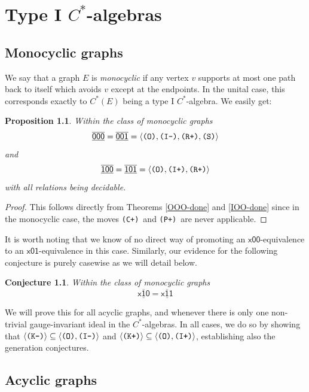\documentclass[12pt]{amsbook}%
\newtheorem{propo}[theor]{Proposition}
\theoremstyle{defin}
\newtheorem{conje}[theor]{Conjecture}
\theoremstyle{remark}
\numberwithin{equation}{chapter}
\numberwithin{theor}{section}
\newcommand{\xyz}[1]{\mbox{$\mathsf{#1}$}}
\newcommand{\xyzrel}[1]{\mbox{$\overline{\underline{\mathsf{ #1}}}$}}
\newcommand{\IIIm}{\mbox{\texttt{\textup{(I-)}}}}
\newcommand{\IIIp}{\mbox{\texttt{\textup{(I+)}}}}
\newcommand{\OOO}{\mbox{\texttt{\textup{(O)}}}}
\newcommand{\CCCp}{\mbox{\texttt{\textup{(C+)}}}}
\newcommand{\RRRp}{\mbox{\texttt{\textup{(R+)}}}}
\newcommand{\PPPp}{\mbox{\texttt{\textup{(P+)}}}}
\newcommand{\KKKp}{\mbox{\texttt{\textup{(K+)}}}}
\newcommand{\KKKm}{\mbox{\texttt{\textup{(K-)}}}}
\newcommand{\SSS}{\mbox{\texttt{\textup{(S)}}}}
\begin{document}

\chapter{Type I $C^*$-algebras}

\section{Monocyclic graphs}

\statusbar{\elsewhered}{\hered}{\sopen}{\sopen}{\elsewhered}{\hered}{\sopen}{\sopen}


We say that a graph $E$ is \emph{monocyclic} if any vertex $v$ supports at most one path back to itself which avoids $v$ except at the endpoints. In the unital case, this corresponds exactly to $C^*(E)$ being a type I $C^*$-algebra. We easily get:

\begin{propo}\label{monoxOz} Within the class of  monocyclic graphs
\[
\xyzrel{000}=\xyzrel{001}=\langle \OOO,\IIIm,\RRRp,\SSS\rangle
\]
and
\[
\xyzrel{100}=\xyzrel{101}=\langle \OOO,\IIIp,\RRRp\rangle
\]
with all relations being decidable.
\end{propo}
\begin{proof}
This follows directly from Theorems \ref{OOO-done} and \ref{IOO-done} since in the monocyclic case, 
the moves  \CCCp\ and \PPPp\ are never applicable.
\end{proof}

It is worth noting that we know of no direct way of promoting an \xyz{x00}-equivalence to an  \xyz{x01}-equivalence in this case. Similarly, our evidence for the following conjecture is purely casewise as we will detail below.

\begin{conje}\label{typeIconj}
Within the class of  monocyclic graphs
\[
\xyzrel{x10}=\xyzrel{x11}
\] 
\end{conje}

We will prove this for all acyclic graphs, and whenever there is only one non-trivial gauge-invariant ideal in the $C^*$-algebras. In all cases, we do so by showing that  $\langle\KKKm\rangle\subseteq \langle\OOO,\IIIm\rangle$ and $\langle\KKKp\rangle\subseteq \langle\OOO,\IIIp\rangle$, establishing also the generation conjectures.



\section{Acyclic graphs}
\end{document}
